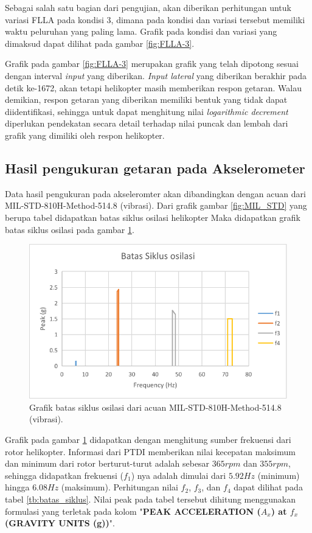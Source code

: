 Sebagai salah satu bagian dari pengujian, akan diberikan perhitungan untuk variasi FLLA pada kondisi 3, dimana pada kondisi dan variasi tersebut memiliki waktu peluruhan yang paling lama. Grafik pada kondisi dan variasi yang dimaksud dapat dilihat pada gambar \ref{fig:FLLA-3}.
 
Grafik pada gambar \ref{fig:FLLA-3} merupakan grafik yang telah dipotong sesuai dengan interval \textit{input} yang diberikan. \textit{Input lateral} yang diberikan berakhir pada detik ke-1672, akan tetapi helikopter masih memberikan respon getaran. Walau demikian, respon getaran yang diberikan memiliki bentuk yang tidak dapat diidentifikasi, sehingga untuk dapat menghitung nilai \textit{logarithmic decrement} diperlukan pendekatan secara detail terhadap nilai puncak dan lembah dari grafik yang dimiliki oleh respon helikopter.

\subsection{Hasil pengukuran getaran pada Akselerometer}

Data hasil pengukuran pada akseleromter akan dibandingkan dengan acuan dari MIL-STD-810H-Method-514.8 (vibrasi). Dari grafik gambar \ref{fig:MIL_STD} yang berupa tabel didapatkan batas siklus osilasi helikopter Maka didapatkan grafik batas siklus osilasi pada gambar \ref{fig:batas_siklus}.

\begin{figure}[H]
	\centering
	\includegraphics[width=0.8\linewidth]{gambar/batas_siklus.png}
	\caption{Grafik batas siklus osilasi dari acuan MIL-STD-810H-Method-514.8 (vibrasi).}
	\label{fig:batas_siklus}
\end{figure}

Grafik pada gambar \ref{fig:batas_siklus} didapatkan dengan menghitung sumber frekuensi dari rotor helikopter. Informasi dari PTDI memberikan nilai kecepatan maksimum dan minimum dari rotor berturut-turut adalah sebesar $365 rpm$ dan $355 rpm$, sehingga didapatkan frekuensi ($f_1$) nya adalah dimulai dari $5.92 Hz$ (minimum) hingga $6.08 Hz$ (maksimum). Perhitungan nilai $f_2$, $f_3$, dan $f_4$ dapat dilihat pada tabel \ref{tb:batas_siklus}. Nilai peak pada tabel tersebut dihitung menggunakan formulasi yang terletak pada kolom "\textbf{PEAK ACCELERATION ($A_x$) at $f_x$ (GRAVITY UNITS (g))}".

